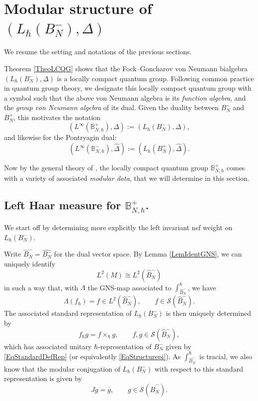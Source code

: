 \documentclass[11pt, reqno]{amsart}
\theoremstyle{definition}
\numberwithin{equation}{section}
\def\Sc{\mathcal S}
\newcommand{\Bor}{B}
\newcommand{\Bbbb}{\mathbb{B}}
\begin{document}
\section{Modular structure of 
\texorpdfstring{$(L_{\hbar}(\Bor_N^-),\Delta)$}{the upper Borel quantum group}} \label{secmodularstructure}


We resume the setting and notations of the previous sections. 

Theorem \ref{TheoLCQG} shows that the Fock--Goncharov von Neumann bialgebra $(L_{\hbar}(\Bor_N^-),\Delta)$ is a locally compact quantum group. Following common practice in quantum group theory, we designate this locally compact quantum group with a symbol such that the above von Neumann algebra is its \emph{function algebra}, and the \emph{group von Neumann algebra} of its dual. Given the duality between $\Bor_N^-$ and $\Bor_N^+$, this motivates the notation 
\begin{equation}\label{EqLCQGFG}
(L^{\infty}(\Bbbb_{N,\hbar}^+),\Delta)  := (L_{\hbar}(\Bor_N^-),\Delta),
\end{equation}
and likewise for the Pontryagin dual:
\begin{equation}\label{EqLCQGFGDual}
(L^{\infty}(\Bbbb_{N,\hbar}^-),\hat{\Delta}) := (L_{\hbar}(\Bor_N^+),\hat{\Delta}).
\end{equation}


Now by the general theory of \cite{KV00,KV03}, the locally compact quantum group $\Bbbb_{N,\hbar}^+$ comes with a variety of associated \emph{modular data}, that we will determine in this section. 

\subsection{Left Haar measure for  \texorpdfstring{$\Bbbb_{N,\hbar}^+$}{the upper Borel quantum group}.}

We start off by determining more explicitly the left invariant nsf weight on $L_{\hbar}(\Bor_N^-)$.

Write $\hat{\Bor}_N^- = \widehat{\Bor_N^-}$ for the dual vector space. By Lemma \ref{LemIdentGNS}, we can uniquely identify
\[
L^2(M) \cong L^2(\hat{\Bor}_N^-)
\]
in such a way that, with $\Lambda$ the GNS-map associated to $\int_{\hat{\Bor}_N^-}^{\hbar}$, we have 
\begin{equation}\label{EqGNSNonTwisted}
\Lambda(f_{\hbar}) = f \in L^2(\hat{\Bor}_N^-),\qquad f\in \Sc(\hat{\Bor}_N^-).
\end{equation}
The associated standard representation of $L_{\hbar}(\Bor_N^-)$ is then uniquely determined by 
\[
f_{\hbar} g = f\times_{\hbar}g,\qquad f,g\in \Sc(\hat{\Bor}_N^-),
\]
which has associated unitary $\hbar$-representation of $\Bor_N^-$ given by \eqref{EqStandardDefRep} (or equivalently \eqref{EqStructurepi}). As $\int_{\hat{\Bor}_N^-}^{\hbar}$ is tracial, we also know that the modular conjugation of $L_{\hbar}(\Bor_N^-)$ with respect to this standard representation is given by 
\begin{equation}\label{EqModConjB}
J g = \overline{g},\qquad g\in \Sc(\hat{\Bor}_N^-).
\end{equation}
\end{document}
